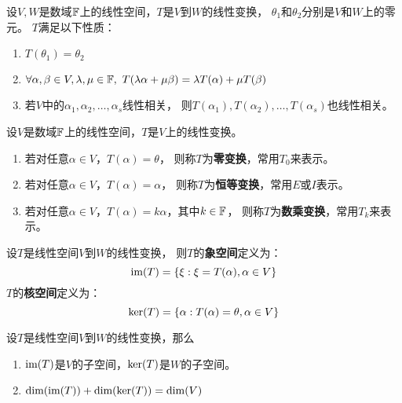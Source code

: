 \begin{theorem}[线性变换的性质]
  设$V,W$是数域$\mathbb{F}$上的线性空间，$T$是$V$到$W$的线性变换，
  $\theta_1$和$\theta_2$分别是$V$和$W$上的零元。
  $T$满足以下性质：
  \begin{enumerate}
    \item
    $T(\theta_1) = \theta_2$
    \item
    $\forall\alpha,\beta\in V,\lambda,\mu\in\mfF,\ 
      T(\lambda\alpha+\mu\beta)=\lambda T(\alpha)+\mu T(\beta)$
    \item
    若$V$中的$\alpha_1,\alpha_2,\dots,\alpha_s$线性相关，
    则$T(\alpha_1),T(\alpha_2),\dots,T(\alpha_s)$也线性相关。
  \end{enumerate}
\end{theorem}

\begin{definition}[特殊的线性变换]
  设$V$是数域$\mathbb{F}$上的线性空间，$T$是$V$上的线性变换。
  \begin{enumerate}
    \item
    若对任意$\alpha\in V$，$T(\alpha)=\theta$，
    则称$T$为\textbf{零变换}，常用$T_0$来表示。
    \item
    若对任意$\alpha\in V$，$T(\alpha)=\alpha$，
    则称$T$为\textbf{恒等变换}，常用$E$或$I$表示。
    \item 
    若对任意$\alpha\in V$，$T(\alpha)=k\alpha$，其中$k\in\mathbb{F}$，
    则称$T$为\textbf{数乘变换}，常用$T_k$来表示。
  \end{enumerate}
\end{definition}

\begin{definition}[象空间与核空间]
  设$T$是线性空间$V$到$W$的线性变换，
  则$T$的\textbf{象空间}定义为：
  \[ \textrm{im}(T) = \{ \xi: \xi=T(\alpha), \alpha\in V\} \]
  $T$的\textbf{核空间}定义为：
  \[ \textrm{ker}(T) = \{ \alpha: T(\alpha)=\theta, \alpha\in V \} \]
\end{definition}

\begin{theorem}[象空间与核空间的性质]
  设$T$是线性空间$V$到$W$的线性变换，那么
  \begin{enumerate}
    \item 
    $\textrm{im}(T)$是$V$的子空间，$\textrm{ker}(T)$是$W$的子空间。
    \item
    $\textrm{dim}(\textrm{im}(T)) + \textrm{dim}(\ker(T)) = \dim(V)$
  \end{enumerate}
\end{theorem}

